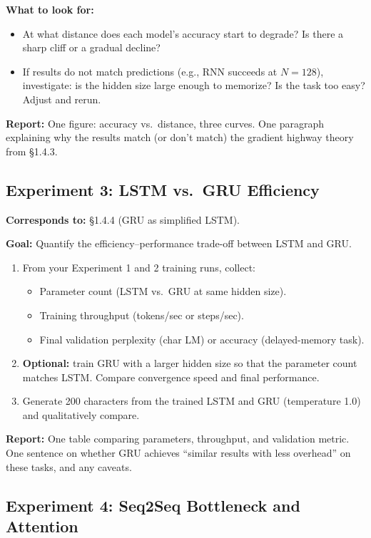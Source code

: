 \textbf{What to look for:}
\begin{itemize}[nosep]
    \item At what distance does each model's accuracy start to degrade? Is there a sharp cliff or a gradual decline?
    \item If results do not match predictions (e.g., RNN succeeds at $N = 128$), investigate: is the hidden size large enough to memorize? Is the task too easy? Adjust and rerun.
\end{itemize}

\textbf{Report:} One figure: accuracy vs.\ distance, three curves. One paragraph explaining why the results match (or don't match) the gradient highway theory from \S1.4.3.

\subsection*{Experiment 3: LSTM vs.\ GRU Efficiency}

\textbf{Corresponds to:} \S1.4.4 (GRU as simplified LSTM).

\textbf{Goal:} Quantify the efficiency--performance trade-off between LSTM and GRU.

\begin{enumerate}[nosep]
    \item From your Experiment 1 and 2 training runs, collect:
    \begin{itemize}[nosep]
        \item Parameter count (LSTM vs.\ GRU at same hidden size).
        \item Training throughput (tokens/sec or steps/sec).
        \item Final validation perplexity (char LM) or accuracy (delayed-memory task).
    \end{itemize}
    \item \textbf{Optional:} train GRU with a larger hidden size so that the parameter count matches LSTM. Compare convergence speed and final performance.
    \item Generate 200 characters from the trained LSTM and GRU (temperature 1.0) and qualitatively compare.
\end{enumerate}

\textbf{Report:} One table comparing parameters, throughput, and validation metric. One sentence on whether GRU achieves ``similar results with less overhead'' on these tasks, and any caveats.

\subsection*{Experiment 4: Seq2Seq Bottleneck and Attention}


